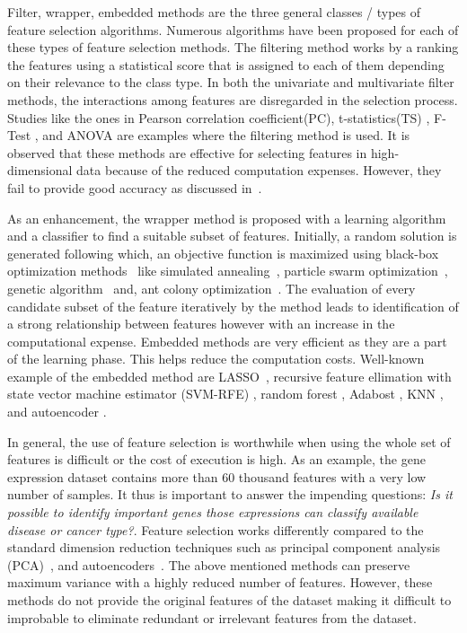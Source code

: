 Filter, wrapper, embedded methods are the three general classes / types of feature selection algorithms. 
Numerous algorithms have been proposed for each of these types of feature selection methods. 
The filtering method works by a ranking the features using a statistical score that is assigned to each of them depending on their relevance to the class type. 
In both the univariate and multivariate filter methods, the interactions among features are disregarded in the selection process. 
Studies like the ones in Pearson correlation coefficient(PC), t-statistics(TS) \cite{speed2003statistical}, F-Test \cite{ding2005minimum}, and ANOVA \cite{ding2015identification} are examples where the filtering method is used. 
It is observed that these methods are effective for selecting features in high-dimensional data because of the reduced computation expenses. 
However, they fail to provide good accuracy as discussed in~\cite{sun2018cross}.

 
As an enhancement, the wrapper method is proposed with a learning algorithm and a classifier to find a suitable subset of features. 
Initially, a random solution is generated following which, an objective function is maximized using black-box optimization methods~\cite{rau2019exploring} like simulated annealing~\cite{jeong2018feature}, particle swarm optimization~\cite{xue2012particle}, genetic algorithm~\cite{wu2011feature} and, ant colony optimization~\cite{kabir2012new}. 
The evaluation of every candidate subset of the feature iteratively by the method leads to identification of a strong relationship between features however with an increase in the computational expense. 
Embedded methods are very efficient as they are a part of the learning phase. 
This helps reduce the computation costs. 
Well-known example of the embedded method are LASSO~\cite{tibshirani1996regression}, recursive feature ellimation with state vector machine estimator (SVM-RFE) \cite{abdullah2019, guyon2002gene, fang2019tightly}, random forest \cite{pouyan2018random, ram2017classification}, Adabost \cite{wang2012adaboost}, KNN \cite{le2019statistical}, and autoencoder \cite{lu2019autoencoder}.


In general, the use of feature selection is worthwhile when using the whole set of features is difficult or the cost of execution is high. 
As an example, the gene expression dataset contains more than 60 thousand features with a very low number of samples. 
It thus is important to answer the impending questions: \textit{Is it possible to identify important genes those expressions can classify available disease or cancer type?}. 
Feature selection works differently compared to the standard dimension reduction techniques such as principal component analysis (PCA)~\cite{hotelling1933analysis}, and autoencoders~\cite{hinton2006reducing}. 
The above mentioned methods can preserve maximum variance with a highly reduced number of features. 
However, these methods do not provide the original features of the dataset making it difficult to improbable to eliminate redundant or irrelevant features from the dataset. 


